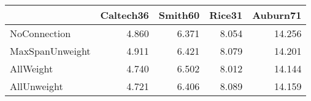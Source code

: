 \begin{tabular}{lrrrr}
\toprule
{} & Caltech36 & Smith60 & Rice31 & Auburn71 \\
\midrule
NoConnection    &     4.860 &   6.371 &  8.054 &   14.256 \\
MaxSpanUnweight &     4.911 &   6.421 &  8.079 &   14.201 \\
AllWeight       &     4.740 &   6.502 &  8.012 &   14.144 \\
AllUnweight     &     4.721 &   6.406 &  8.089 &   14.159 \\
\bottomrule
\end{tabular}

